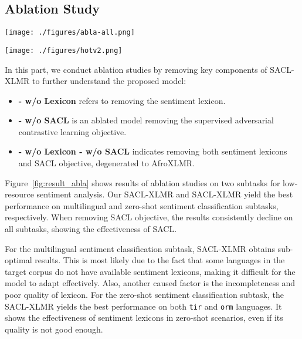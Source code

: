 \documentclass[11pt]{article}
\begin{document}
\subsection{Ablation Study}

\begin{figure*}[t]
    \centering
    \texttt{[image: ./figures/abla-all.png]}
    \caption{Ablation study results on two subtasks. We report the weighted-F1 score.     }
    \label{fig:result_abla}
\end{figure*}


\begin{figure*}[t]
\centering
\texttt{[image: ./figures/hotv2.png]}
\caption{The normalized confusion matrices for SACL-XLMR on three test sets of AfriSenti.
The rows represent the actual sentiment labels, whereas the columns represent predictions made by the model. 
Each cell  represents that the percentage of class  was predicted as class .
The values of the diagonal elements represent the degree of correctly predicted classes. 
The higher the diagonal values of the confusion matrix the better, indicating many correct predictions.    
}
    \label{fig:error}
\end{figure*}

In this part, we conduct ablation studies by removing key components of SACL-XLMR to further understand the proposed model:
\begin{itemize}
    \item  \textbf{- w/o Lexicon} refers to removing the sentiment lexicon.
    \item  \textbf{- w/o SACL} is an ablated model removing the supervised adversarial contrastive learning objective.
    \item  \textbf{- w/o Lexicon - w/o SACL} indicates removing both sentiment lexicons and SACL objective, degenerated to AfroXLMR.
\end{itemize}


Figure~\ref{fig:result_abla} shows results of ablation studies on two subtasks for low-resource sentiment analysis. 
Our SACL-XLMR and
SACL-XLMR  yield
the best performance on multilingual and zero-shot sentiment classification subtasks, respectively. When removing SACL objective, the results consistently decline on all subtasks, showing the effectiveness of SACL.

For the multilingual sentiment classification subtask, SACL-XLMR obtains sub-optimal  results. This is most likely due to the fact that some languages in the target corpus do not have available sentiment lexicons, making it difficult for the model to adapt effectively.
Also, another caused factor is the incompleteness and poor quality of lexicon.
For the zero-shot sentiment classification subtask, the SACL-XLMR yields the best performance on both \texttt{tir} and \texttt{orm} languages. 
It shows the effectiveness of sentiment lexicons in zero-shot scenarios, even if its quality is not good enough.
\end{document}
